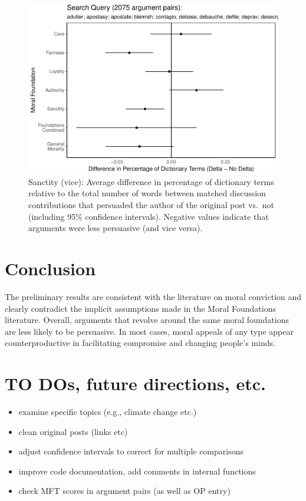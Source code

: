 \documentclass[12pt,]{article}
\providecommand{\tightlist}{%
\setlength{\itemsep}{0pt}\setlength{\parskip}{0pt}}
\begin{document}
\begin{figure}
\centering
\includegraphics{prelim_files/figure-latex/purity vice-1.pdf}
\caption{Sanctity (vice): Average difference in percentage of dictionary
terms relative to the total number of words between matched discussion
contributions that persuaded the author of the original post vs.~not
(including 95\% confidence intervals). Negative values indicate that
arguments were less persuasive (and vice versa).}
\end{figure}

\clearpage

\section{Conclusion}\label{conclusion}

The preliminary results are consistent with the literature on moral
conviction and clearly contradict the implicit assumptions made in the
Moral Foundations literature. Overall, arguments that revolve around the
same moral foundations are less likely to be persuasive. In most cases,
moral appeals of any type appear counterproductive in facilitating
compromise and changing people's minds.

\section{TO DOs, future directions,
etc.}\label{to-dos-future-directions-etc.}

\begin{itemize}
\tightlist
\item
  examine specific topics (e.g., climate change etc.)
\item
  clean original posts (links etc)
\item
  adjust confidence intervals to correct for multiple comparisons
\item
  improve code documentation, add comments in internal functions
\item
  check MFT scores in argument pairs (as well as OP entry)
\end{itemize}




\newpage
\singlespacing 

\end{document}
